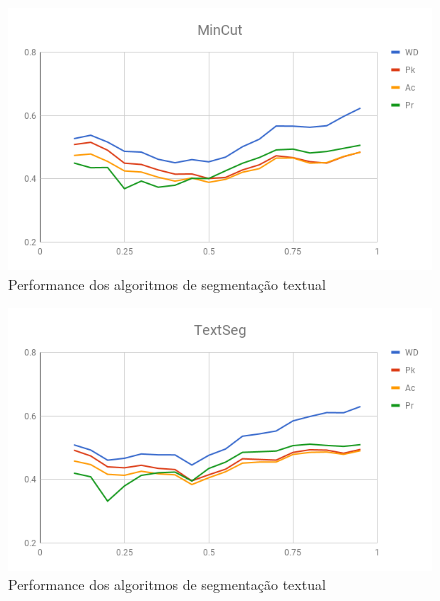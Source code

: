   \begin{figure}[!h]
	  \centering
	  \includegraphics[width=1\textwidth]{conteudo/capitulos/figs/graficos/analiseNSegRate-MinCut.png}
	  \caption{Performance dos algoritmos de segmentação textual}
	  \label{fig:grafico-medidas-tradicionais}
  \end{figure}


  \begin{figure}[!h]
	  \centering
	  \includegraphics[width=1\textwidth]{conteudo/capitulos/figs/graficos/analiseNSegRate-UISeg.png}
	  \caption{Performance dos algoritmos de segmentação textual}
	  \label{fig:grafico-medidas-tradicionais}
  \end{figure}

